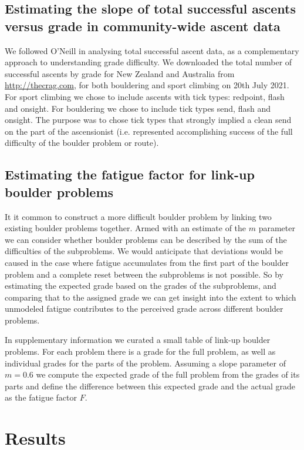 \documentclass{article}
\begin{document}
\subsection*{Estimating the slope of total successful ascents versus grade in community-wide ascent data}

We followed O'Neill \cite{oneill2002} in analysing total successful ascent data, as a complementary approach to understanding grade difficulty. We downloaded the total number of successful ascents by grade for New Zealand and Australia from \url{http://thecrag.com}, for both bouldering and sport climbing on 20th July 2021. For sport climbing we chose to include ascents with tick types: \gls{redpoint}, \gls{flash} and \gls{onsight}. For bouldering we chose to include tick types \gls{send}, \gls{flash} and \gls{onsight}. The purpose was to chose tick types that strongly implied a clean send on the part of the ascensionist (i.e. represented accomplishing success of the full difficulty of the boulder problem or route).
\subsection*{Estimating the fatigue factor for link-up boulder problems}

It it common to construct a more difficult boulder problem by linking two existing boulder problems together. Armed with an estimate of the $m$ parameter we can consider whether boulder problems can be described by the sum of the difficulties of the subproblems. We would anticipate that deviations would be caused in the case where fatigue accumulates from the first part of the boulder problem and a complete reset between the subproblems is not possible. So by estimating the expected grade based on the grades of the subproblems, and comparing that to the assigned grade we can get insight into the extent to which unmodeled fatigue contributes to the perceived grade across different boulder problems.

In supplementary information we curated a small table of link-up boulder problems. For each problem there is a grade for the full problem, as well as individual grades for the parts of the problem. Assuming a slope parameter of $m=0.6$ we compute the expected grade of the full problem from the grades of its parts and define the difference between this expected grade and the actual grade as the fatigue factor $F$.

\section*{Results}
\end{document}
